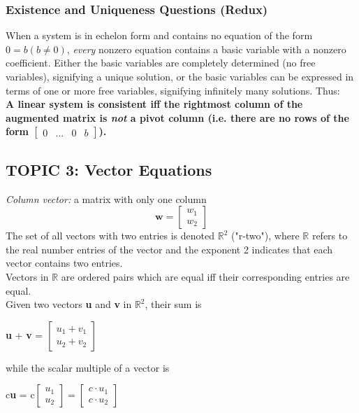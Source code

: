 \documentclass[12pt]{article} %
\newcommand{\R}{\mathbb{R}}
\begin{document}
\subsubsection{Existence and Uniqueness Questions (Redux)}
When a system is in echelon form and contains no equation of the form $0 = b (b \neq 0)$, \emph{every} nonzero equation contains a basic variable with a nonzero coefficient. Either the basic variables are completely determined (no free variables), signifying a unique solution, or the basic variables can be expressed in terms of one or more free variables, signifying infinitely many solutions. Thus:\\
\textbf{A linear system is consistent iff the rightmost column of the augmented matrix is \emph{not} a pivot column (i.e. there are no rows of the form $\begin{bmatrix} 0 & ... & 0 & b\end{bmatrix}$).}


\subsection{TOPIC 3: Vector Equations}
\emph{Column vector:} a matrix with only one column
$$\mathbf{w}= \begin{bmatrix}w_1 \\ w_2 \end{bmatrix}$$
The set of all vectors with two entries is denoted $\mathbb{R}^2$ ("r-two"), where $\mathbb{R}$ refers to the real number entries of the vector and the exponent 2 indicates that each vector contains two entries.\\
Vectors in $\mathbb{R}$ are ordered pairs which are equal iff their corresponding entries are equal.\\

Given two vectors \textbf{u} and \textbf{v} in $\R^2$, their sum is 
\begin{center}\textbf{u} + \textbf{v} = $\begin{bmatrix}u_1 + v_1 \\ u_2 + v_2\end{bmatrix}$\end{center}
while the scalar multiple of a vector is 
\begin{center}c\textbf{u} = c$\begin{bmatrix}u_1 \\ u_2\end{bmatrix} =\begin{bmatrix}c\cdot u_1 \\ c\cdot u_2\end{bmatrix}  $\end{center}
\end{document}
